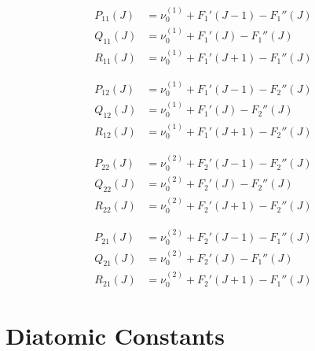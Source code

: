 \documentclass[11pt, twoside, fleqn]{report}
\begin{document}
\begin{align*}
    P_{11}(J) &= \nu_0^{(1)} + F_1'(J - 1) - F_1''(J) \\
    Q_{11}(J) &= \nu_0^{(1)} + F_1'(J) - F_1''(J) \\
    R_{11}(J) &= \nu_0^{(1)} + F_1'(J + 1) - F_1''(J)
\end{align*}

\begin{align*}
    P_{12}(J) &= \nu_0^{(1)} + F_1'(J - 1) - F_2''(J) \\
    Q_{12}(J) &= \nu_0^{(1)} + F_1'(J) - F_2''(J) \\
    R_{12}(J) &= \nu_0^{(1)} + F_1'(J + 1) - F_2''(J)
\end{align*}

\begin{align*}
    P_{22}(J) &= \nu_0^{(2)} + F_2'(J - 1) - F_2''(J) \\
    Q_{22}(J) &= \nu_0^{(2)} + F_2'(J) - F_2''(J) \\
    R_{22}(J) &= \nu_0^{(2)} + F_2'(J + 1) - F_2''(J)
\end{align*}

\begin{align*}
    P_{21}(J) &= \nu_0^{(2)} + F_2'(J - 1) - F_1''(J) \\
    Q_{21}(J) &= \nu_0^{(2)} + F_2'(J) - F_1''(J) \\
    R_{21}(J) &= \nu_0^{(2)} + F_2'(J + 1) - F_1''(J)
\end{align*}

\appendix
\chapter{Diatomic Constants}
\label{a:diatomic_constants}
\end{document}
